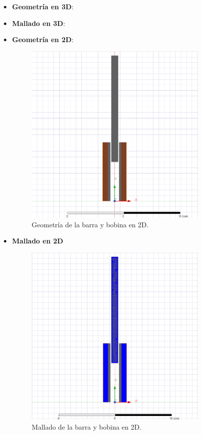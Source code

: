 \begin{itemize}
    \item \textbf{Geometría en 3D}:
    \item \textbf{Mallado en 3D}:
    \item \textbf{Geometría en 2D}:
    \begin{figure}[H]
        \centering
        \includegraphics[width=9cm]{FigurasMemoria/BarGeom.png}
        \caption{Geometría de la barra y bobina en 2D.}
        \label{fig:BarGeom} %
    \end{figure}
    \item \textbf{Mallado en 2D}
    \begin{figure}[H]
        \centering
        \includegraphics[width=9cm]{FigurasMemoria/BarGeomMesh.png}
        \caption{Mallado de la barra y bobina en 2D.}

\end{figure}
\end{itemize}
